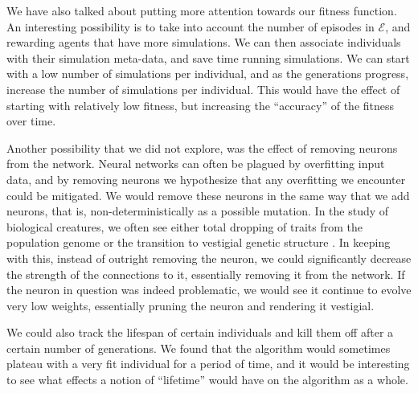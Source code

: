 \documentclass{article}
\begin{document}
We have also talked about putting more attention towards our fitness
function. An interesting possibility is to take into account the number of
episodes in $\bm{\mathcal{E}}$, and rewarding agents that have more
simulations. We can then associate individuals with their simulation meta-data,
and save time running simulations. We can start with a low number of simulations
per individual, and as the generations progress, increase the number of
simulations per individual. This would have the effect of starting with
relatively low fitness, but increasing the ``accuracy'' of the fitness over
time.

Another possibility that we did not explore, was the effect of removing neurons
from the network. Neural networks can often be plagued by overfitting input
data, and by removing neurons we hypothesize that any overfitting we encounter
could be mitigated. We would remove these neurons in the same way that we add
neurons, that is, non-deterministically as a possible mutation. In the study of
biological creatures, we often see either total dropping of traits from the
population genome or the transition to vestigial genetic structure
\cite{lehman}. In keeping with this, instead of outright removing the neuron, we
could significantly decrease the strength of the connections to it, essentially
removing it from the network. If the neuron in question was indeed problematic,
we would see it continue to evolve very low weights, essentially pruning the
neuron and rendering it vestigial.

We could also track the lifespan of certain individuals and kill them off after
a certain number of generations. We found that the algorithm would sometimes
plateau with a very fit individual for a period of time, and it would be
interesting to see what effects a notion of ``lifetime'' would have on the
algorithm as a whole.


\\~\\
\hline
\\~\\
\end{document}
